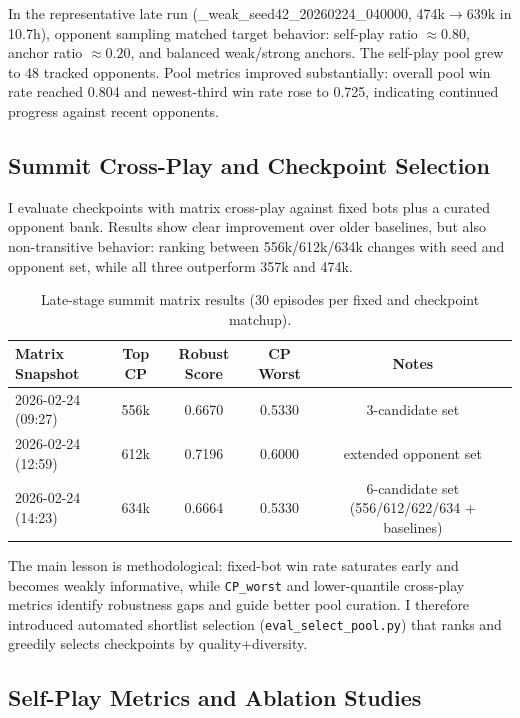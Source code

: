 \documentclass[11pt]{article}
\begin{document}
In the representative late run (\_weak\_seed42\_20260224\_040000, 474k$\rightarrow$639k in 10.7h), opponent sampling matched target behavior: self-play ratio $\approx0.80$, anchor ratio $\approx0.20$, and balanced weak/strong anchors. The self-play pool grew to 48 tracked opponents. Pool metrics improved substantially: overall pool win rate reached 0.804 and newest-third win rate rose to 0.725, indicating continued progress against recent opponents.

\subsection{Summit Cross-Play and Checkpoint Selection}

I evaluate checkpoints with matrix cross-play against fixed bots plus a curated opponent bank. Results show clear improvement over older baselines, but also non-transitive behavior: ranking between 556k/612k/634k changes with seed and opponent set, while all three outperform 357k and 474k.

\begin{table}[h]
\centering
\small
\begin{tabular}{lcccc}
\toprule
\textbf{Matrix Snapshot} & \textbf{Top CP} & \textbf{Robust Score} & \textbf{CP Worst} & \textbf{Notes} \\
\midrule
2026-02-24 (09:27) & 556k & 0.6670 & 0.5330 & 3-candidate set \\
2026-02-24 (12:59) & 612k & 0.7196 & 0.6000 & extended opponent set \\
2026-02-24 (14:23) & 634k & 0.6664 & 0.5330 & 6-candidate set (556/612/622/634 + baselines) \\
\bottomrule
\end{tabular}
\caption{Late-stage summit matrix results (30 episodes per fixed and checkpoint matchup).}
\label{tab:late-matrix}
\end{table}

The main lesson is methodological: fixed-bot win rate saturates early and becomes weakly informative, while \texttt{CP\_worst} and lower-quantile cross-play metrics identify robustness gaps and guide better pool curation. I therefore introduced automated shortlist selection (\texttt{eval\_select\_pool.py}) that ranks and greedily selects checkpoints by quality+diversity.

\subsection{Self-Play Metrics and Ablation Studies}
\end{document}
